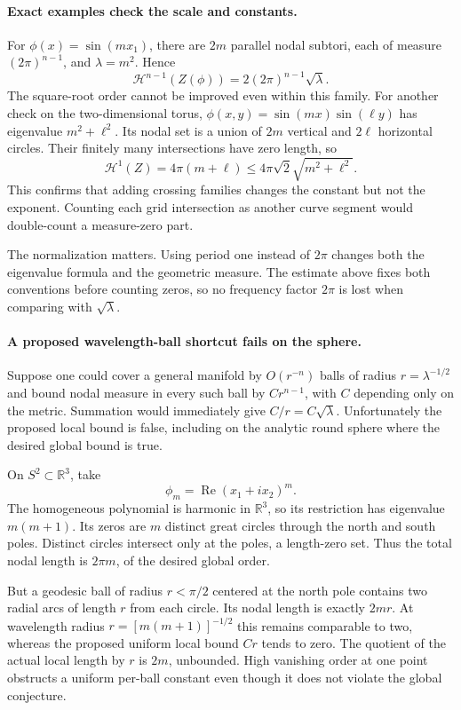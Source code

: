 \documentclass[11pt]{article}
\begin{document}
\paragraph{Exact examples check the scale and constants.}
For $\phi(x)=\sin(mx_1)$, there are $2m$ parallel nodal subtori,
each of measure $(2\pi)^{n-1}$, and $\lambda=m^2$. Hence
\[
 \mathcal H^{n-1}(Z(\phi))=2(2\pi)^{n-1}\sqrt\lambda.
\]
The square-root order cannot be improved even within this family.
For another check on the two-dimensional torus,
$\phi(x,y)=\sin(mx)\sin(\ell y)$ has eigenvalue $m^2+\ell^2$.
Its nodal set is a union of $2m$ vertical and $2\ell$ horizontal
circles. Their finitely many intersections have zero length, so
\[
             \mathcal H^1(Z)=4\pi(m+\ell)
                    \le4\pi\sqrt2\sqrt{m^2+\ell^2}.
\]
This confirms that adding crossing families changes the constant but
not the exponent. Counting each grid intersection as another curve
segment would double-count a measure-zero part.

The normalization matters. Using period one instead of $2\pi$ changes
both the eigenvalue formula and the geometric measure. The estimate
above fixes both conventions before counting zeros, so no frequency
factor $2\pi$ is lost when comparing with $\sqrt\lambda$.

\paragraph{A proposed wavelength-ball shortcut fails on the sphere.}
Suppose one could cover a general manifold by $O(r^{-n})$ balls of
radius $r=\lambda^{-1/2}$ and bound nodal measure in every such ball
by $Cr^{n-1}$, with $C$ depending only on the metric. Summation would
immediately give $C/r=C\sqrt\lambda$. Unfortunately the proposed
local bound is false, including on the analytic round sphere where
the desired global bound is true.

On $S^2\subset\mathbb R^3$, take
\[
                 \phi_m=\operatorname{Re}(x_1+ix_2)^m.
\]
The homogeneous polynomial is harmonic in $\mathbb R^3$, so its
restriction has eigenvalue $m(m+1)$. Its zeros are $m$ distinct great
circles through the north and south poles. Distinct circles intersect
only at the poles, a length-zero set. Thus the total nodal length is
$2\pi m$, of the desired global order.

But a geodesic ball of radius $r<\pi/2$ centered at the north pole
contains two radial arcs of length $r$ from each circle. Its nodal
length is exactly $2mr$. At wavelength radius
$r=[m(m+1)]^{-1/2}$ this remains comparable to two, whereas the
proposed uniform local bound $Cr$ tends to zero. The quotient of the
actual local length by $r$ is $2m$, unbounded. High vanishing order
at one point obstructs a uniform per-ball constant even though it
does not violate the global conjecture.
\end{document}
